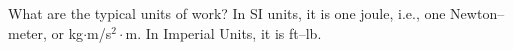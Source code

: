 {What are the typical units of work?}
{In SI units, it is one joule, i.e., one Newton--meter, or kg$\cdot$m/s$^2\cdot$m. In Imperial Units, it is ft--lb.}
